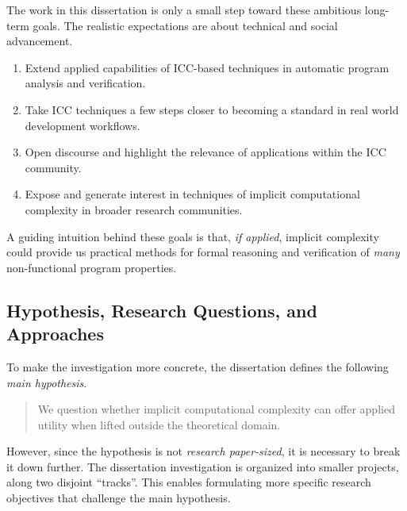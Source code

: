 The work in this dissertation is only a small step toward these ambitious long-term goals.
The realistic expectations are about technical and social advancement.
\begin{enumerate}
\item Extend {applied} capabilities of ICC-based techniques in automatic program analysis and verification.
\item Take ICC techniques a few steps closer to becoming a standard in real world development workflows.
\item Open discourse and highlight the relevance of applications within the ICC community.
\item Expose and generate interest in techniques of implicit computational complexity in broader research communities.
\end{enumerate}
A guiding intuition behind these goals is that, \emph{if applied}, implicit complexity could provide us practical methods for formal reasoning and verification of \emph{many} non-functional program properties.

\subsection{Hypothesis, Research Questions, and Approaches}
\label{subsec:research-goals}

To make the investigation more concrete, the dissertation defines the following \emph{main hypothesis}.
\begin{quotation}
\noindent We question whether implicit computational complexity can offer applied utility when lifted outside the theoretical domain.
\end{quotation}
However, since the hypothesis is not \emph{research paper-sized}, it is necessary to break it down further.
The dissertation investigation is organized into smaller projects, along two disjoint \enquote{tracks}.
This enables formulating more specific research objectives that challenge the main hypothesis.

